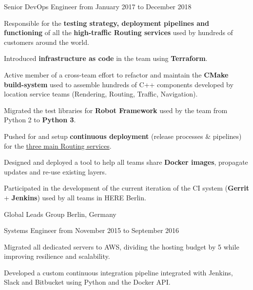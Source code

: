 \documentclass[10pt, a4paper]{awesome-cv}
\begin{document}
\begin{cventries}
	\vspace{2pt}
	\cventry
	{Senior DevOps Engineer}
	{from January 2017 to December 2018}
	{
		\begin{cvitems}
			\item {Responsible for the \textbf{testing strategy, deployment pipelines and functioning} of all the \textbf{high-traffic Routing services} used by hundreds of customers around the world.}
			\item {Introduced \textbf{infrastructure as code} in the team using \textbf{Terraform}.}
			\item {Active member of a cross-team effort to refactor and maintain the \textbf{CMake build-system} used to assemble hundreds of C++ components developed by location service teams (Rendering, Routing, Traffic, Navigation).}
			\item {Migrated the test libraries for \textbf{Robot Framework} used by the team from Python 2 to \textbf{Python 3}.}
			\item {Pushed for and setup \textbf{continuous deployment} (release processes \& pipelines) for the \href{https://developer.here.com/products/routing}{three main Routing services}.}
			\item {Designed and deployed a tool to help all teams share \textbf{Docker images}, propagate updates and re-use existing layers.}
			\item {Participated in the development of the current iteration of the CI system (\textbf{Gerrit} + \textbf{Jenkins}) used by all teams in HERE Berlin.}
		\end{cvitems}
	}
\end{cventries}

\begin{cventries}

	\cventrytitle
	{Global Leads Group}
	{Berlin, Germany}

	\cventry
	{Systems Engineer}
	{from November 2015 to September 2016}
	{
		\begin{cvitems}
			\item {Migrated all dedicated servers to AWS, dividing the hosting budget by 5 while improving resilience and scalability.}
			\item {Developed a custom continuous integration pipeline integrated with Jenkins, Slack and Bitbucket using Python and the Docker API.}
		\end{cvitems}
	}

\end{cventries}
\end{document}
